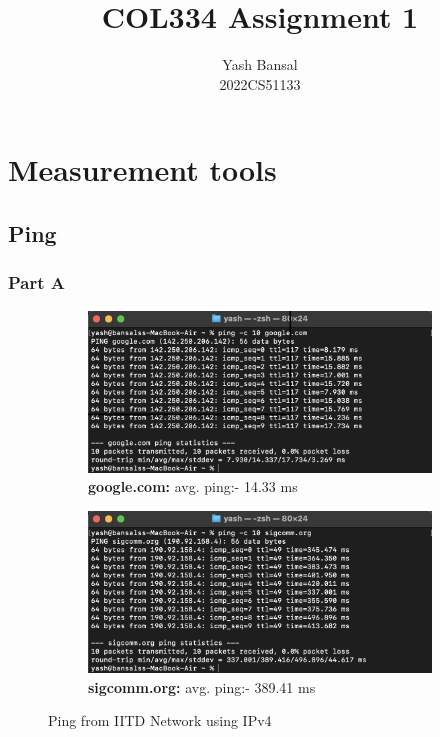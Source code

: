 \documentclass{article}
\title{COL334 Assignment 1}
\author{Yash Bansal \\ 2022CS51133}
\begin{document}
\maketitle

\section{Measurement tools}

\subsection{Ping}

\subsubsection{Part A}
\begin{figure}[H]
    \centering
    \begin{subfigure}[b]{0.48\textwidth}
        \centering
        \includegraphics[width=\textwidth]{ping_google_iitd_ipv4.png}
        \caption*{\textbf{google.com:} avg. ping:- 14.33 ms}
    \end{subfigure}
    \hfill
    \begin{subfigure}[b]{0.48\textwidth}
        \centering
        \includegraphics[width=\textwidth]{ping_sigcomm_iitd_ipv4.png}
        \caption*{\textbf{sigcomm.org:} avg. ping:- 389.41 ms}
    \end{subfigure}
    \caption*{Ping from IITD Network using IPv4}
\end{figure}
\end{document}
